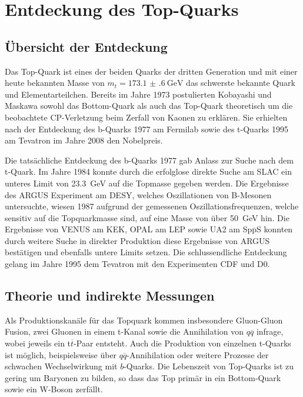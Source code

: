 
\section{Entdeckung des Top-Quarks}


\subsection{Übersicht der Entdeckung}

Das Top-Quark ist eines der beiden Quarks der dritten Generation und mit einer heute bekannten Masse von  $m_t = \SI{173.1(6)}{\giga\electronvolt}$ das schwerste bekannte Quark und Elementarteilchen.
Bereits im Jahre 1973 postulierten Kobayashi und Maskawa sowohl das Bottom-Quark als auch das Top-Quark theoretisch um die beobachtete CP-Verletzung beim Zerfall von Kaonen zu erklären.
Sie erhielten nach der Entdeckung des b-Quarks 1977 am Fermilab sowie des t-Quarks 1995 am Tevatron im Jahre 2008 den Nobelpreis.

Die tatsächliche Entdeckung des b-Quarks 1977 gab Anlass zur Suche nach dem t-Quark.
Im Jahre 1984 konnte durch die erfolglose direkte Suche am SLAC ein unteres Limit von \SI{23.3}{\giga\electronvolt} auf die Topmasse gegeben werden.
Die Ergebnisse des ARGUS Experiment am DESY, welches Oszillationen von B-Mesonen untersuchte, wiesen 1987 aufgrund der gemessenen Oszillationsfrequenzen, welche sensitiv auf die Topquarkmasse sind, auf eine Masse von über \SI{50}{\giga\electronvolt} hin.
Die Ergebnisse von VENUS am KEK, OPAL am LEP sowie UA2 am Sp$\overline{\text{p}}$S konnten durch weitere Suche in direkter Produktion diese Ergebnisse von ARGUS bestätigen und ebenfalls untere Limits setzen. 
Die schlussendliche Entdeckung gelang im Jahre 1995 dem Tevatron mit den Experimenten CDF und D0.

\subsection{Theorie und indirekte Messungen}

Als Produktionskanäle für das Topquark kommen insbesondere Gluon-Gluon Fusion, zwei Gluonen in einem t-Kanal sowie die Annihilation von $q\overline{q}$ infrage, wobei jeweils ein t$\overline{t}$-Paar entsteht.
Auch die Produktion von einzelnen t-Quarks ist möglich, beispielsweise über $q\overline{q}$-Annihilation oder weitere Prozesse der schwachen Wechselwirkung mit $b$-Quarks.
Die Lebenszeit von Top-Quarks ist zu gering um Baryonen zu bilden, so dass das Top primär in ein Bottom-Quark sowie ein W-Boson zerfällt.

